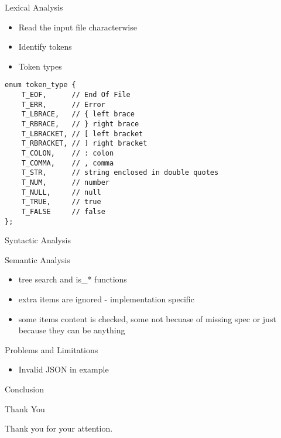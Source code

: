 \documentclass{beamer}
\begin{document}
\begin{frame}[fragile]{Lexical Analysis}

\begin{itemize}
    \item Read the input file characterwise
    \pause \item Identify tokens
    \pause \item Token types
\end{itemize}

\begin{Verbatim}[fontsize=\small]
enum token_type {
    T_EOF,      // End Of File
    T_ERR,      // Error
    T_LBRACE,   // { left brace
    T_RBRACE,   // } right brace
    T_LBRACKET, // [ left bracket
    T_RBRACKET, // ] right bracket
    T_COLON,    // : colon
    T_COMMA,    // , comma
    T_STR,      // string enclosed in double quotes
    T_NUM,      // number
    T_NULL,     // null
    T_TRUE,     // true
    T_FALSE     // false
};
\end{Verbatim}
\end{frame}

\begin{frame}{Syntactic Analysis}

\end{frame}

\begin{frame}{Semantic Analysis}
\begin{itemize}
	\item tree search and is\_* functions
	\item extra items are ignored - implementation specific
	\item some items content is checked, some not becuase of missing spec or just because they can be anything
\end{itemize}
\end{frame}

\begin{frame}{Problems and Limitations}

    \begin{itemize}

        \item Invalid JSON in example

    \end{itemize}

\end{frame}

\begin{frame}{Conclusion}

\end{frame}

\begin{frame}{Thank You}
    \Huge{\centerline{Thank you for your attention.}}
\end{frame}

\end{document}
